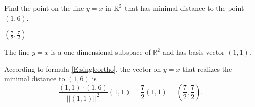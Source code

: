 \documentclass{ximera}
\begin{document}
\begin{exercise} \label{YZ_9.1.3}
Find the point on the line $y=x$ in $\mbox{$\mathbb{R}$}^2$ that has minimal distance to the point $(1,6)$.
\begin{solution}

\ans $(\frac{7}{2},\frac{7}{2})$

\soln The line $y=x$ is a one-dimensional subspace of $\mathbb R^2$ and has basis vector $(1,1)$.

According to formula \eqref{E:singleortho}, the vector on $y = x$ that realizes the minimal distance to $(1,6)$ is 
\[
\frac{(1,1)\cdot (1,6)}{||(1,1)||^2}(1,1) = \frac{7}{2}(1,1) = (\frac{7}{2},\frac{7}{2}).
\]
\end{solution}
\end{exercise}
\end{document}

